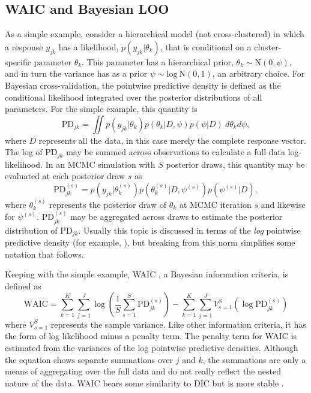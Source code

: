\documentclass[letterpaper]{article}
\begin{document}
\subsection{WAIC and Bayesian LOO}

As a simple example, consider a hierarchical model (not cross-clustered) in which a response $y_{jk}$ has a likelihood, 
$p(y_{jk} | \theta_k)$, 
that is conditional on a cluster-specific parameter $\theta_k$. This parameter has a hierarchical prior,
$\theta_k \sim \mathrm{N}(0, \psi)$, and in turn the variance has as a prior
$\psi \sim \mathrm{log~N}(0, 1)$, an arbitrary choice. For Bayesian cross-validation, the pointwise predictive density is defined as the conditional likelihood integrated over the posterior distributions of all parameters. For the simple example, this quantity is
\begin{equation} 
	\mathrm{PD}_{jk} = 
	\iint
		p(y_{jk} | \theta_k)
		p(\theta_k | D, \psi)
		p(\psi | D)
	~d \theta_k d \psi
,\end{equation}
where $D$ represents all the data, in this case merely the complete response vector.
The log of $\mathrm{PD}_{jk}$ may be summed across observations to calculate a full data log-likelihood.
In an MCMC simulation with $S$ posterior draws, this quantity may be evaluated at each posterior draw $s$ as
\begin{equation} 
	\mathrm{PD}_{jk}^{(s)} = 
	p(y_{jk} | \theta_k^{(s)})
	p(\theta_k^{(s)} | D, \psi^{(s)})
	p(\psi^{(s)} | D)
,\end{equation}
where $\theta_k^{(s)}$ represents the posterior draw of $\theta_k$ at MCMC iteration $s$ and likewise for $\psi^{(s)}$.
$\mathrm{PD}_{jk}^{(s)}$ may be aggregated across draws to estimate the posterior distribution of $\mathrm{PD}_{jk}$. Usually this topic is discussed in terms of the \emph{log} pointwise predictive density (for example, ), but breaking from this norm simplifies some notation that follows.

Keeping with the simple example, WAIC \cite{watanabe2010asymptotic}, a Bayesian information criteria, is defined as
\begin{equation} \label{eq:waic}
	\mathrm{WAIC} = 
		\sum_{k=1}^K \sum_{j=1}^J \log  
			\left (\frac{1}{S} \sum_{s=1}^{S} \mathrm{PD}_{jk}^{(s)} \right ) -
		\sum_{k=1}^K \sum_{j=1}^J V_{s=1}^{S} 
			\left ( \log \mathrm{PD}_{jk}^{(s)} \right )
\end{equation}
where $V_{s=1}^{S}$ represents the sample variance.
Like other information criteria, it has the form of log likelihood minus a penalty term. The penalty term for WAIC is estimated from the variances of the log pointwise predictive densities. Although the equation shows separate summations over $j$ and $k$, the summations are only a means of aggregating over the full data and do not really reflect the nested nature of the data. WAIC bears some similarity to DIC \cite{Spiegelhalter2002} but is more stable \cite{vehtari2015efficient}.
\end{document}
